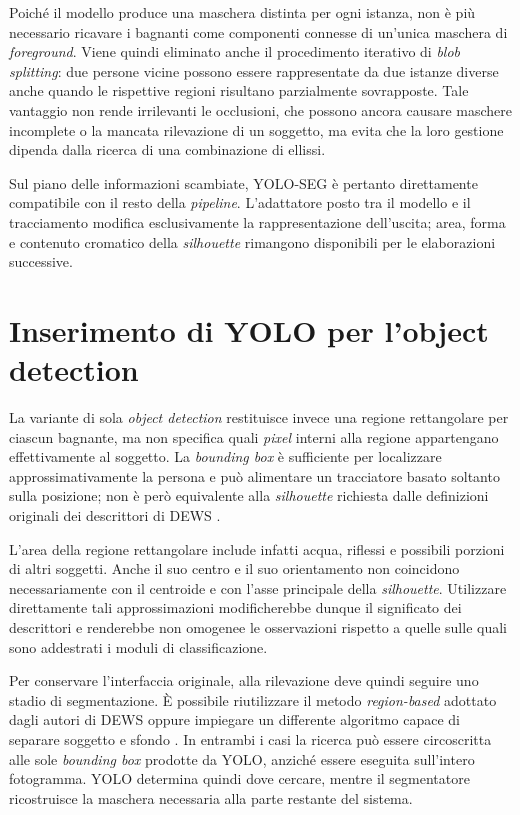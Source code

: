 Poiché il modello produce una maschera distinta per ogni istanza, non è più necessario ricavare i bagnanti come componenti connesse di un'unica maschera di \textit{foreground}. Viene quindi eliminato anche il procedimento iterativo di \textit{blob splitting}: due persone vicine possono essere rappresentate da due istanze diverse anche quando le rispettive regioni risultano parzialmente sovrapposte. Tale vantaggio non rende irrilevanti le occlusioni, che possono ancora causare maschere incomplete o la mancata rilevazione di un soggetto, ma evita che la loro gestione dipenda dalla ricerca di una combinazione di ellissi.

Sul piano delle informazioni scambiate, YOLO-SEG è pertanto direttamente compatibile con il resto della \textit{pipeline}. L'adattatore posto tra il modello e il tracciamento modifica esclusivamente la rappresentazione dell'uscita; area, forma e contenuto cromatico della \textit{silhouette} rimangono disponibili per le elaborazioni successive.

\section{Inserimento di YOLO per l'object detection}

La variante di sola \textit{object detection} restituisce invece una regione rettangolare per ciascun bagnante, ma non specifica quali \textit{pixel} interni alla regione appartengano effettivamente al soggetto. La \textit{bounding box} è sufficiente per localizzare approssimativamente la persona e può alimentare un tracciatore basato soltanto sulla posizione; non è però equivalente alla \textit{silhouette} richiesta dalle definizioni originali dei descrittori di DEWS \cite{Eng2008DEWS}.

L'area della regione rettangolare include infatti acqua, riflessi e possibili porzioni di altri soggetti. Anche il suo centro e il suo orientamento non coincidono necessariamente con il centroide e con l'asse principale della \textit{silhouette}. Utilizzare direttamente tali approssimazioni modificherebbe dunque il significato dei descrittori e renderebbe non omogenee le osservazioni rispetto a quelle sulle quali sono addestrati i moduli di classificazione.

Per conservare l'interfaccia originale, alla rilevazione deve quindi seguire uno stadio di segmentazione. È possibile riutilizzare il metodo \textit{region-based} adottato dagli autori di DEWS oppure impiegare un differente algoritmo capace di separare soggetto e sfondo \cite{Eng2004Region,Eng2006Robust,Eng2008DEWS}. In entrambi i casi la ricerca può essere circoscritta alle sole \textit{bounding box} prodotte da YOLO, anziché essere eseguita sull'intero fotogramma. YOLO determina quindi dove cercare, mentre il segmentatore ricostruisce la maschera necessaria alla parte restante del sistema.

